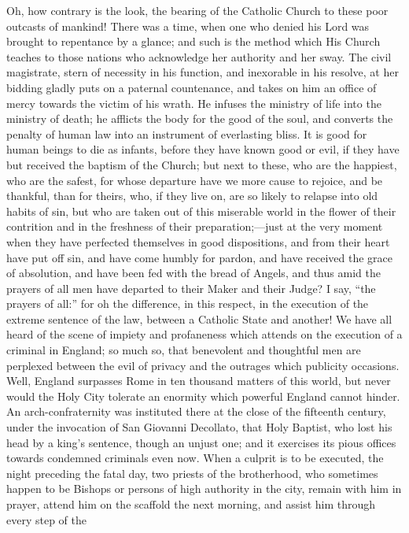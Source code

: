 Oh, how contrary is the look, the bearing of the Catholic Church to
these poor outcasts of mankind! There was a time, when one who denied
his Lord was brought to repentance by a glance; and such is the method
which His Church teaches to those nations who acknowledge her
authority and her sway. The civil magistrate, stern of necessity in
his function, and inexorable in his resolve, at her bidding gladly
puts on a paternal countenance, and takes on him an office of mercy
towards the victim of his wrath. He infuses the ministry of life into
the ministry of death; he afflicts the body for the good of the soul,
and converts the penalty of human law into an instrument of everlasting bliss. It is good for human beings to die as infants,
before they have known good or evil, if they have but received the
baptism of the Church; but next to these, who are the happiest, who
are the safest, for whose departure have we more cause to rejoice, and
be thankful, than for theirs, who, if they live on, are so likely to
relapse into old habits of sin, but who are taken out of this
miserable world in the flower of their contrition and in the freshness
of their preparation;—just at the very moment when they have
perfected themselves in good dispositions, and from their heart have
put off sin, and have come humbly for pardon, and have received the
grace of absolution, and have been fed with the bread of Angels, and
thus amid the prayers of all men have departed to their Maker and
their Judge? I say, ``the prayers of all:'' for oh the
difference, in this respect, in the execution of the extreme sentence
of the law, between a Catholic State and another! We have all heard of
the scene of impiety and profaneness which attends on the execution of
a criminal in England; so much so, that benevolent and thoughtful men
are perplexed between the evil of privacy and the outrages which
publicity occasions. Well, England surpasses Rome in ten thousand
matters of this world, but never would the Holy City tolerate an
enormity which powerful England cannot hinder. An arch-confraternity
was instituted there at the close of the fifteenth century, under the
invocation of San Giovanni Decollato, that Holy Baptist, who lost his
head by a king's sentence, though an unjust one; and it exercises its
pious offices towards condemned criminals even now. When a culprit is
to be executed, the night preceding the fatal day, two priests of the
brotherhood, who sometimes happen to be Bishops or persons of high
authority in the city, remain with him in prayer, attend him on the
scaffold the next morning, and assist him through every step of the

